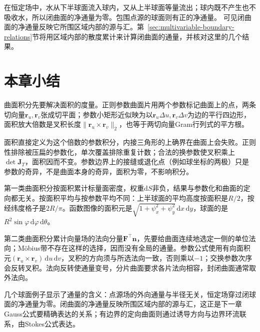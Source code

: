 在恒定场中，水从下半球面流入球内，又从上半球面等量流出；球内既不产生也不吸收水，所以闭曲面的净通量为零。包围点源的球面则有正的净通量。
可见闭曲面的净通量反映它所围区域内部的源与汇。第~\ref{sec:multivariable-boundary-relations}节将用区域内部的散度累计来计算闭曲面的通量，并核对这里的几个结果。

\FloatBarrier

\FloatBarrier
\section{本章小结}
\label{sec:surface-integrals-chapter-summary}

曲面积分先要解决面积的度量。正则参数曲面片用两个参数标记曲面上的点，两条切向量$\bm r_u,\bm r_v$张成切平面；参数小矩形近似映为以$\bm r_u\Delta u,\bm r_v\Delta v$为边的平行四边形，面积放大倍数是叉积长度$\lVert\bm r_u\times\bm r_v\rVert_2$，也等于两切向量Gram行列式的平方根。

面积直接定义为这个倍数的参数积分，内接三角形的上确界在曲面上会失败。正则性排除被压扁的参数化，单次覆盖排除重复计数；合法的换参数使叉积乘上$\det\bm J_T$，面积因而不变。参数边界上的接缝或退化点（例如球坐标的两极）只是参数的奇异，不是曲面本身的奇异，面积为零，不影响积分。

第一类曲面积分按面积累计标量面密度，权重$\mathrm dS$非负，结果与参数化和曲面的定向都无关。按面积平均与按参数平均不同：上半球面的平均高度按面积是$R/2$，按经纬度格子是$2R/\pi$。函数图像的面积元是$\sqrt{1+\psi_x^2+\psi_y^2}\,\mathrm dx\,\mathrm dy$，球面的是$R^2\sin\varphi\,\mathrm d\varphi\,\mathrm d\theta$。

第二类曲面积分累计向量场的法向分量$\bm F^\top\bm n$，先要给曲面连续地选定一侧的单位法向；Möbius带不存在这样的选择，因而没有全局的通量。参数公式使用有向面积元$(\bm r_u\times\bm r_v)\,\mathrm du\,\mathrm dv$，叉积的方向须与所选法向一致，否则乘以$-1$；交换参数次序会反转叉积。法向反转使通量变号，分片曲面要求各片法向相容，封闭曲面通常取外法向。

几个球面例子显示了通量的含义：点源场的外向通量与半径无关，恒定场穿过闭球面的净通量为零。闭曲面的净通量反映所围区域内部的源与汇，这正是下一章Gauss公式要精确表达的关系；有边界的定向曲面则通过诱导方向与边界环流联系，由Stokes公式表达。
